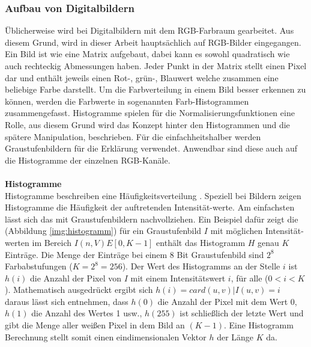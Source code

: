 \documentclass[a4paper,12pt,oneside]{article}
\begin{document}
  \subsubsection{Aufbau von Digitalbildern}\label{s.aufbdigibilder}
Üblicherweise wird bei Digitalbildern mit dem RGB-Farbraum gearbeitet. Aus diesem Grund, wird in dieser Arbeit hauptsächlich auf RGB-Bilder eingegangen. Ein Bild ist wie eine Matrix aufgebaut, dabei kann es sowohl quadratisch wie auch rechteckig Abmessungen haben. Jeder Punkt in der Matrix stellt einen Pixel dar und enthält jeweils einen Rot-, grün-, Blauwert welche zusammen eine beliebige Farbe darstellt. Um die Farbverteilung in einem Bild besser erkennen zu können, werden die Farbwerte in sogenannten Farb-Histogrammen zusammengefasst. Histogramme spielen für die Normalisierungsfunktionen eine Rolle, aus diesem Grund wird das Konzept hinter den Histogrammen und die spätere Manipulation, beschrieben. Für die einfachheitshalber werden Graustufenbildern für die Erklärung verwendet. Anwendbar sind diese auch auf die Histogramme der einzelnen RGB-Kanäle.\\\\
\textbf{Histogramme}\label{s.histogramme}\\
Histogramme beschreiben eine Häufigkeitsverteilung \cite[42ff.]{burger2009digitale}. Speziell bei Bildern zeigen Histogramme die Häufigkeit der auftretenden Intensität-werte. Am einfachsten lässt sich das mit Graustufenbildern nachvollziehen. Ein Beispiel dafür zeigt die (Abbildung \ref{img:histogramm}) für ein Graustufenbild $I$ mit möglichen Intensität-werten im Bereich $I(n,V)E[0,K-1]$ enthält das Histogramm $H$ genau $K$ Einträge. Die Menge der Einträge bei einem 8 Bit Graustufenbild sind $2^8$ Farbabstufungen ($K=2^8=256$). Der Wert des Histogramms an der Stelle $i$ ist $h(i)$ die Anzahl der Pixel von $I$ mit einem Intensitätswert $i$, für alle ($0<i<K$). Mathematisch ausgedrückt ergibt sich $h(i)=card{(u,v) | I(u,v)=i}$\\
daraus lässt sich entnehmen, dass $h(0)$ die Anzahl der Pixel mit dem Wert 0, $h(1)$ die Anzahl des Wertes 1 usw., $h(255)$ ist schließlich der letzte Wert und gibt die Menge aller weißen Pixel in dem Bild an $(K-1)$. Eine Histogramm Berechnung stellt somit einen eindimensionalen Vektor $h$ der Länge $K$ da.\\
\end{document}
